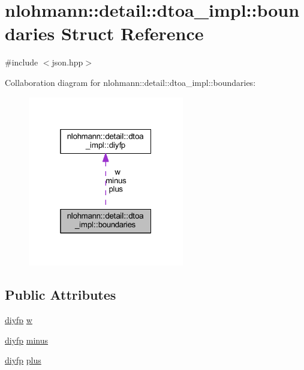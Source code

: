 \hypertarget{structnlohmann_1_1detail_1_1dtoa__impl_1_1boundaries}{}\section{nlohmann\+::detail\+::dtoa\+\_\+impl\+::boundaries Struct Reference}
\label{structnlohmann_1_1detail_1_1dtoa__impl_1_1boundaries}


{\ttfamily \#include $<$json.\+hpp$>$}



Collaboration diagram for nlohmann\+::detail\+::dtoa\+\_\+impl\+::boundaries\+:
\nopagebreak
\begin{figure}[H]
\begin{center}
\leavevmode
\includegraphics[width=193pt]{structnlohmann_1_1detail_1_1dtoa__impl_1_1boundaries__coll__graph}
\end{center}
\end{figure}
\subsection*{Public Attributes}
\begin{DoxyCompactItemize}
\item 
\mbox{\hyperlink{structnlohmann_1_1detail_1_1dtoa__impl_1_1diyfp}{diyfp}} \mbox{\hyperlink{structnlohmann_1_1detail_1_1dtoa__impl_1_1boundaries_ad1668c60aeade5f2557fafed8b8aee1a}{w}}
\item 
\mbox{\hyperlink{structnlohmann_1_1detail_1_1dtoa__impl_1_1diyfp}{diyfp}} \mbox{\hyperlink{structnlohmann_1_1detail_1_1dtoa__impl_1_1boundaries_aec4e5028333c01f3229062f31ce16763}{minus}}
\item 
\mbox{\hyperlink{structnlohmann_1_1detail_1_1dtoa__impl_1_1diyfp}{diyfp}} \mbox{\hyperlink{structnlohmann_1_1detail_1_1dtoa__impl_1_1boundaries_a3321ae2816a6ec5250a0d8e29f798232}{plus}}
\end{DoxyCompactItemize}


